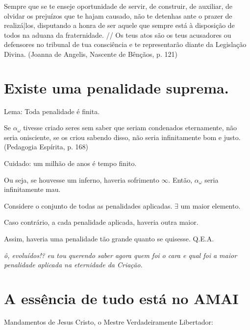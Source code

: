 \documentclass[12pt,a4paper]{article}
\begin{document}
			\begin{flushright}
			\end{flushright}

Sempre que se te enseje oportunidade de servir, de construir, de auxiliar, de olvidar os preju\'izos que te hajam causado, n\~ao te detenhas ante o prazer de realiz\'a|los, disputando a honra de ser aquele que sempre est\'a \`a disposi\c{c}\~ao de todos na aduana da fraternidade. // Os teus atos s\~ao os teus acusadores ou defensores no tribunal de tua consci\^encia e te representar\~ao diante da Legisla\c{c}\~ao Divina. (Joanna de Angelis, Nascente de B\^en\c{c}\~aos, p. 121)

	\section{Existe uma penalidade suprema.} %
			\begin{flushright}
			\end{flushright}

		Lema: Toda penalidade \'e finita.

		Se $ \alpha_\omega $ tivesse criado seres sem saber que seriam condenados eternamente, n\~ao seria onisciente, se os criou sabendo disso, n\~ao seria infinitamente bom e justo. (Pedagogia Esp\'irita\cite{x}, p. 168)

		Cuidado: um milh\~ao de anos \'e tempo finito.

		Ou seja, se houvesse um inferno, haveria sofrimento $ \infty $. Ent\~ao, $ \alpha_\omega $ seria infinitamente mau.

		Considere o conjunto de todas as penalidades aplicadas. $\exists$ um maior elemento.

		Caso contr\'ario, a cada penalidade aplicada, haveria outra maior.

		Assim, haveria uma penalidade t\~ao grande quanto se quisesse. Q.E.A.\cite{x}

		\emph{\^o, evolu\'idos!? eu tou querendo saber agora quem foi o cara e qual foi a maior penalidade aplicada na eternidade da Cria\c{c}\~ao.}

	\section{A ess\^encia de tudo est\'a no AMAI}
		\begin{flushright}
		\end{flushright}

		Mandamentos de Jesus Cristo, o Mestre Verdadeiramente Libertador:
\end{document}
